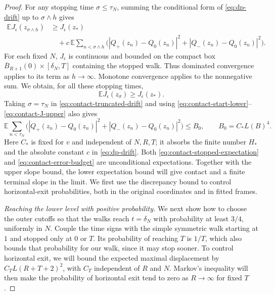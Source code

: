 \begin{proof}
For any stopping time $\sigma\le\tau_N$, summing the conditional form of
\eqref{eq:dp-drift} up to $\sigma\wedge h$ gives
\begin{equation}\label{eq:contact-truncated-drift}
\begin{split}
  \mathbb E J_\epsilon(z_{\sigma\wedge h})
  &\ge J_\epsilon(z_*)\\
  &\quad+c\,\mathbb E\sum_{n<\sigma\wedge h}
          \bigl(|Q_+(z_n)-Q_0(z_n)|^2+|Q_-(z_n)-Q_0(z_n)|^2\bigr).
\end{split}
\end{equation}
For each fixed $N$, $J_\epsilon$ is continuous and bounded on the compact
box $\overline B_{R+1}(0)\times[\delta_N,T]$ containing the stopped walk.
Thus dominated convergence applies to its
term as $h\to\infty$.  Monotone convergence applies to the nonnegative sum.
We obtain, for all these stopping times,
\begin{equation}\label{eq:contact-stopped-expectation}
  \mathbb E J_\epsilon(z_\sigma)\ge J_\epsilon(z_*).
\end{equation}
Taking $\sigma=\tau_N$ in \eqref{eq:contact-truncated-drift} and using
\eqref{eq:contact-start-lower}--\eqref{eq:contact-J-upper} also gives
\begin{equation}\label{eq:contact-error-budget}
  \mathbb E\sum_{n<\tau_N}
       \bigl(|Q_+(z_n)-Q_0(z_n)|^2+|Q_-(z_n)-Q_0(z_n)|^2\bigr)
  \le B_0,\qquad B_0=C_*L(B)^4.
\end{equation}
Here $C_*$ is fixed for $v$ and independent of $N,R,T$; it absorbs the
finite number $H_*$ and the absolute constant $c$ in \eqref{eq:dp-drift}.
Both \eqref{eq:contact-stopped-expectation} and
\eqref{eq:contact-error-budget} are unconditional expectations. Together
with the upper slope bound, the lower expectation bound will give contact
and a finite terminal slope in the limit. We first use the discrepancy
bound to control horizontal-exit probabilities, both in the original
coordinates and in fitted frames.

\medskip\noindent\emph{Reaching the lower level with positive probability.}
We next show how to choose the outer cutoffs so that the walks reach
$t=\delta_N$ with probability at least $3/4$, uniformly in $N$.
Couple the time signs with
the simple symmetric walk starting at $1$ and stopped only at $0$ or $T$.
Its probability of reaching $T$ is $1/T$, which also bounds that probability
for our walk, since it may stop sooner. To control horizontal exit, we will
bound the expected maximal displacement by $C_T L(R+T+2)^2$, with $C_T$ independent
of $R$ and $N$. Markov's inequality will then make the probability of
horizontal exit tend to zero as $R\to\infty$ for fixed $T$.


\end{proof}
